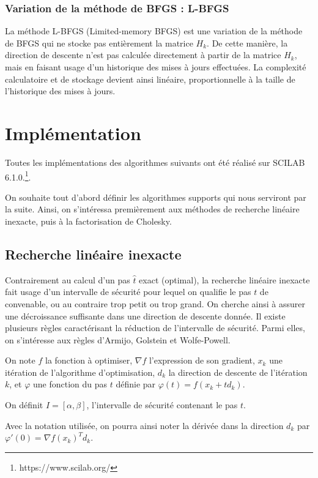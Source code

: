 \documentclass[3p, twocolumn]{elsarticle}
\begin{document}
\subsubsection{Variation de la méthode de BFGS : L-BFGS}
La méthode L-BFGS (Limited-memory BFGS) est une variation de la méthode de BFGS qui ne stocke pas entièrement la matrice $H_k$. De cette manière, la direction de descente n'est pas calculée directement à partir de la matrice $H_k$, mais en faisant usage d'un historique des mises à jours effectuées. La complexité calculatoire et de stockage devient ainsi linéaire, proportionnelle à la taille de l'historique des mises à jours. 

\section{Implémentation}
Toutes les implémentations des algorithmes suivants ont été réalisé sur SCILAB 6.1.0.\footnote{https://www.scilab.org/}. 

On souhaite tout d'abord définir les algorithmes supports qui nous serviront par la suite. Ainsi, on s'intéressa premièrement aux méthodes de recherche linéaire inexacte, puis à la factorisation de Cholesky. 

\subsection{Recherche linéaire inexacte}
Contrairement au calcul d'un pas $\hat t$ exact (optimal), la recherche linéaire inexacte fait usage d'un intervalle de sécurité pour lequel on qualifie le pas $t$ de convenable, ou au contraire trop petit ou trop grand. On cherche ainsi à assurer une décroissance suffisante dans une direction de descente donnée. Il existe plusieurs règles caractérisant la réduction de l'intervalle de sécurité. Parmi elles, on s'intéresse aux règles d'Armijo, Golstein et Wolfe-Powell.

On note $f$ la fonction à optimiser, $\nabla f$ l'expression de son gradient, $x_k$ une itération de l'algorithme d'optimisation, $d_k$ la direction de descente de l'itération $k$, et $\varphi$ une fonction du pas $t$ définie par $\varphi(t)=f(x_k+td_k)$.

On définit $I=[\alpha,\beta]$, l'intervalle de sécurité contenant le pas $t$. 

\begin{rmk}
    Avec la notation utilisée, on pourra ainsi noter la dérivée dans la direction $d_k$ par $\varphi'(0)=\nabla f(x_k)^T d_k$. 
\end{rmk}
\end{document}
